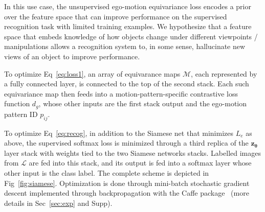 \documentclass[10pt,twocolumn,letterpaper]{article}
\newcommand{\changes}{}
\begin{document}
In this use case, the unsupervised ego-motion equivariance loss encodes a prior over the feature space that can improve performance on the supervised recognition task with limited training examples. \changes{We hypothesize that a feature space that embeds knowledge of how objects change under different viewpoints / manipulations allows a recognition system to, in some sense, hallucinate new views of an object to improve performance.}%

To optimize Eq~\eqref{eq:loss1}, an array of equivarance maps $\mathcal{M}$, each represented by a fully connected layer, is connected to the top of the second stack. Each such equivariance map then feeds into a motion-pattern-specific contrastive loss function $d_{g}$, whose other inputs are the first stack output and the ego-motion pattern ID $p_{ij}$.

To optimize Eq~\eqref{eq:recog}, in addition to the Siamese net that minimizes $L_{e}$ as above, the supervised softmax loss is minimized through a third replica of the $\mathbf{z}_{\bm{\theta}}$ layer stack with weights tied to the two Siamese networks stacks. {Labelled images from $\mathcal{L}$ are fed into this stack, and its output is fed into} a softmax layer whose other input is the class label. The complete scheme is depicted in Fig~\ref{fig:siamese}.
Optimization is done through mini-batch stochastic gradient descent implemented through backpropagation with the Caffe package~\cite{caffe} (more details in Sec~\ref{sec:exp} and Supp).
\end{document}
